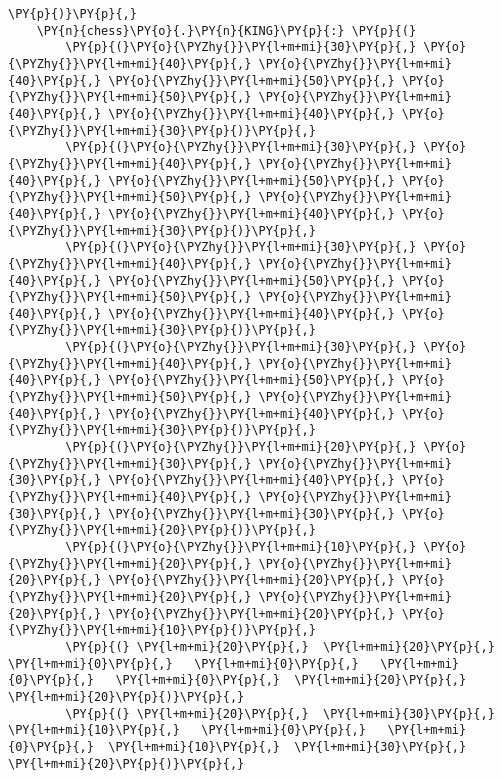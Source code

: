 \begin{tcolorbox}[fontupper=\linespread{.66}\selectfont, breakable, size=fbox, boxrule=1pt, pad at break*=1mm,colback=cellbackground, colframe=cellborder]
\begin{Verbatim}[commandchars=\\\{\}]
    \PY{p}{)}\PY{p}{,}
    \PY{n}{chess}\PY{o}{.}\PY{n}{KING}\PY{p}{:} \PY{p}{(}
        \PY{p}{(}\PY{o}{\PYZhy{}}\PY{l+m+mi}{30}\PY{p}{,} \PY{o}{\PYZhy{}}\PY{l+m+mi}{40}\PY{p}{,} \PY{o}{\PYZhy{}}\PY{l+m+mi}{40}\PY{p}{,} \PY{o}{\PYZhy{}}\PY{l+m+mi}{50}\PY{p}{,} \PY{o}{\PYZhy{}}\PY{l+m+mi}{50}\PY{p}{,} \PY{o}{\PYZhy{}}\PY{l+m+mi}{40}\PY{p}{,} \PY{o}{\PYZhy{}}\PY{l+m+mi}{40}\PY{p}{,} \PY{o}{\PYZhy{}}\PY{l+m+mi}{30}\PY{p}{)}\PY{p}{,}
        \PY{p}{(}\PY{o}{\PYZhy{}}\PY{l+m+mi}{30}\PY{p}{,} \PY{o}{\PYZhy{}}\PY{l+m+mi}{40}\PY{p}{,} \PY{o}{\PYZhy{}}\PY{l+m+mi}{40}\PY{p}{,} \PY{o}{\PYZhy{}}\PY{l+m+mi}{50}\PY{p}{,} \PY{o}{\PYZhy{}}\PY{l+m+mi}{50}\PY{p}{,} \PY{o}{\PYZhy{}}\PY{l+m+mi}{40}\PY{p}{,} \PY{o}{\PYZhy{}}\PY{l+m+mi}{40}\PY{p}{,} \PY{o}{\PYZhy{}}\PY{l+m+mi}{30}\PY{p}{)}\PY{p}{,}
        \PY{p}{(}\PY{o}{\PYZhy{}}\PY{l+m+mi}{30}\PY{p}{,} \PY{o}{\PYZhy{}}\PY{l+m+mi}{40}\PY{p}{,} \PY{o}{\PYZhy{}}\PY{l+m+mi}{40}\PY{p}{,} \PY{o}{\PYZhy{}}\PY{l+m+mi}{50}\PY{p}{,} \PY{o}{\PYZhy{}}\PY{l+m+mi}{50}\PY{p}{,} \PY{o}{\PYZhy{}}\PY{l+m+mi}{40}\PY{p}{,} \PY{o}{\PYZhy{}}\PY{l+m+mi}{40}\PY{p}{,} \PY{o}{\PYZhy{}}\PY{l+m+mi}{30}\PY{p}{)}\PY{p}{,}
        \PY{p}{(}\PY{o}{\PYZhy{}}\PY{l+m+mi}{30}\PY{p}{,} \PY{o}{\PYZhy{}}\PY{l+m+mi}{40}\PY{p}{,} \PY{o}{\PYZhy{}}\PY{l+m+mi}{40}\PY{p}{,} \PY{o}{\PYZhy{}}\PY{l+m+mi}{50}\PY{p}{,} \PY{o}{\PYZhy{}}\PY{l+m+mi}{50}\PY{p}{,} \PY{o}{\PYZhy{}}\PY{l+m+mi}{40}\PY{p}{,} \PY{o}{\PYZhy{}}\PY{l+m+mi}{40}\PY{p}{,} \PY{o}{\PYZhy{}}\PY{l+m+mi}{30}\PY{p}{)}\PY{p}{,}
        \PY{p}{(}\PY{o}{\PYZhy{}}\PY{l+m+mi}{20}\PY{p}{,} \PY{o}{\PYZhy{}}\PY{l+m+mi}{30}\PY{p}{,} \PY{o}{\PYZhy{}}\PY{l+m+mi}{30}\PY{p}{,} \PY{o}{\PYZhy{}}\PY{l+m+mi}{40}\PY{p}{,} \PY{o}{\PYZhy{}}\PY{l+m+mi}{40}\PY{p}{,} \PY{o}{\PYZhy{}}\PY{l+m+mi}{30}\PY{p}{,} \PY{o}{\PYZhy{}}\PY{l+m+mi}{30}\PY{p}{,} \PY{o}{\PYZhy{}}\PY{l+m+mi}{20}\PY{p}{)}\PY{p}{,}
        \PY{p}{(}\PY{o}{\PYZhy{}}\PY{l+m+mi}{10}\PY{p}{,} \PY{o}{\PYZhy{}}\PY{l+m+mi}{20}\PY{p}{,} \PY{o}{\PYZhy{}}\PY{l+m+mi}{20}\PY{p}{,} \PY{o}{\PYZhy{}}\PY{l+m+mi}{20}\PY{p}{,} \PY{o}{\PYZhy{}}\PY{l+m+mi}{20}\PY{p}{,} \PY{o}{\PYZhy{}}\PY{l+m+mi}{20}\PY{p}{,} \PY{o}{\PYZhy{}}\PY{l+m+mi}{20}\PY{p}{,} \PY{o}{\PYZhy{}}\PY{l+m+mi}{10}\PY{p}{)}\PY{p}{,}
        \PY{p}{(} \PY{l+m+mi}{20}\PY{p}{,}  \PY{l+m+mi}{20}\PY{p}{,}   \PY{l+m+mi}{0}\PY{p}{,}   \PY{l+m+mi}{0}\PY{p}{,}   \PY{l+m+mi}{0}\PY{p}{,}   \PY{l+m+mi}{0}\PY{p}{,}  \PY{l+m+mi}{20}\PY{p}{,}  \PY{l+m+mi}{20}\PY{p}{)}\PY{p}{,}
        \PY{p}{(} \PY{l+m+mi}{20}\PY{p}{,}  \PY{l+m+mi}{30}\PY{p}{,}  \PY{l+m+mi}{10}\PY{p}{,}   \PY{l+m+mi}{0}\PY{p}{,}   \PY{l+m+mi}{0}\PY{p}{,}  \PY{l+m+mi}{10}\PY{p}{,}  \PY{l+m+mi}{30}\PY{p}{,}  \PY{l+m+mi}{20}\PY{p}{)}\PY{p}{,}

\end{Verbatim}
\end{tcolorbox}
